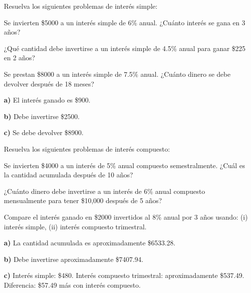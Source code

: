 \begin{exercise}
\problem Resuelva los siguientes problemas de interés simple:

\begin{exerciselist}
    \item Se invierten \$5000 a un interés simple de 6\% anual. ¿Cuánto interés se gana en 3 años?
    \item ¿Qué cantidad debe invertirse a un interés simple de 4.5\% anual para ganar \$225 en 2 años?
    \item Se prestan \$8000 a un interés simple de 7.5\% anual. ¿Cuánto dinero se debe devolver después de 18 meses?
\end{exerciselist}

\begin{solucion}
\textbf{a)} El interés ganado es \$900.

\textbf{b)} Debe invertirse \$2500.

\textbf{c)} Se debe devolver \$8900.
\end{solucion}
\end{exercise}

\begin{exercise}
\problem Resuelva los siguientes problemas de interés compuesto:

\begin{exerciselist}
    \item Se invierten \$4000 a un interés de 5\% anual compuesto semestralmente. ¿Cuál es la cantidad acumulada después de 10 años?
    \item ¿Cuánto dinero debe invertirse a un interés de 6\% anual compuesto mensualmente para tener \$10,000 después de 5 años?
    \item Compare el interés ganado en \$2000 invertidos al 8\% anual por 3 años usando: (i) interés simple, (ii) interés compuesto trimestral.
\end{exerciselist}

\begin{solucion}
\textbf{a)} La cantidad acumulada es aproximadamente \$6533.28.

\textbf{b)} Debe invertirse aproximadamente \$7407.94.

\textbf{c)} Interés simple: \$480. Interés compuesto trimestral: aproximadamente \$537.49. Diferencia: \$57.49 más con interés compuesto.
\end{solucion}
\end{exercise}
